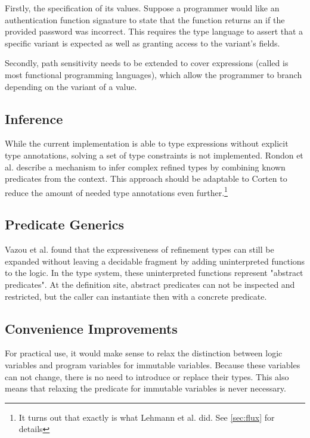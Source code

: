 \documentclass[twoside, english, final]{sdqthesis}
\theoremstyle{definition}
\begin{document}
Firstly, the specification of its values. Suppose a programmer would like an authentication function signature to state that the function returns an  if the provided password was incorrect. This requires the type language to assert that a specific variant is expected as well as granting access to the variant's fields.

Secondly, path sensitivity needs to be extended to cover  expressions (called  is most functional programming languages), which allow the programmer to branch depending on the variant of a value.

\subsection{Inference}

While the current implementation is able to type expressions without explicit type annotations, solving a set of type constraints is not implemented. 
Rondon et al. \cite{rondon_liquid_2008} describe a mechanism to infer complex refined types by combining known predicates from the context. This approach should be adaptable to Corten to reduce the amount of needed type annotations even further.\footnote{It turns out that exactly is what Lehmann et al. \cite{lehmann_flux_2022} did. See \cref{sec:flux} for details}


\subsection{Predicate Generics}

Vazou et al. \cite{vazou_abstract_2013} found that the expressiveness of refinement types can still be expanded without leaving a decidable fragment by adding uninterpreted functions to the logic. In the type system, these uninterpreted functions represent "abstract predicates". At the definition site, abstract predicates can not be inspected and restricted, but the caller can instantiate then with a concrete predicate.

\subsection{Convenience Improvements}

For practical use, it would make sense to relax the distinction between logic variables and program variables for immutable variables. Because these variables can not change, there is no need to introduce or replace their types. This also means that relaxing the predicate for immutable variables is never necessary.
\end{document}
